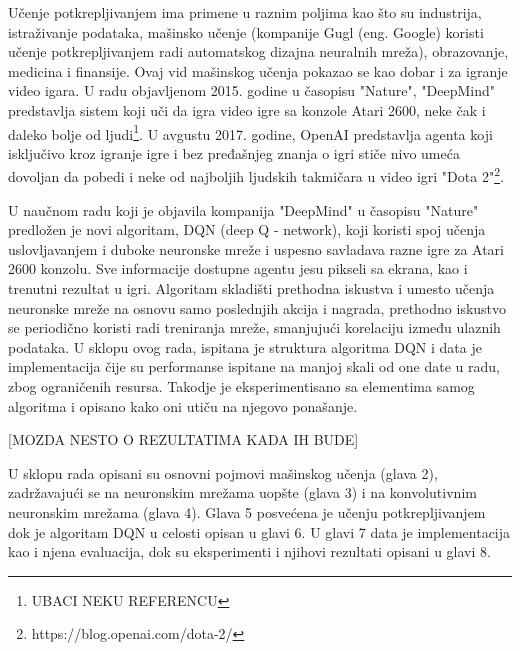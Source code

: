 Učenje potkrepljivanjem ima primene u raznim poljima kao što su industrija, istraživanje podataka, mašinsko učenje (kompanije Gugl (eng. Google) koristi učenje potkrepljivanjem radi automatskog dizajna neuralnih mreža), obrazovanje, medicina i finansije. Ovaj vid mašinskog učenja pokazao se kao dobar i za igranje video igara.  U radu objavljenom 2015. godine u časopisu "Nature", "DeepMind" predstavlja sistem koji uči da igra video igre sa konzole Atari 2600, neke čak i daleko bolje od ljudi\footnote{UBACI NEKU REFERENCU}. U avgustu 2017. godine, OpenAI predstavlja agenta koji isključivo kroz igranje igre i bez pređašnjeg znanja o igri stiče nivo umeća dovoljan da pobedi i neke od najboljih ljudskih takmičara u video igri "Dota 2"\footnote{https://blog.openai.com/dota-2/}. 

U naučnom radu koji je objavila kompanija "DeepMind" u časopisu "Nature" predložen je novi algoritam, DQN (deep Q - network), koji koristi spoj učenja uslovljavanjem i duboke neuronske mreže i uspesno savladava razne igre za Atari 2600 konzolu. Sve informacije dostupne agentu jesu pikseli sa ekrana, kao i trenutni rezultat u igri. Algoritam skladišti prethodna iskustva i umesto učenja neuronske mreže na osnovu samo poslednjih akcija i nagrada, prethodno iskustvo se periodično koristi radi treniranja mreže, smanjujući korelaciju između ulaznih podataka. 
U sklopu ovog rada, ispitana je struktura algoritma DQN i data je implementacija čije su performanse ispitane na manjoj skali od one date u radu, zbog ograničenih resursa. Takodje je eksperimentisano sa elementima samog algoritma i opisano kako oni utiču na njegovo ponašanje.


[MOZDA NESTO O REZULTATIMA KADA IH BUDE]


U sklopu rada opisani su osnovni pojmovi mašinskog učenja (glava 2), zadržavajući se na neuronskim mrežama uopšte (glava 3) i na konvolutivnim neuronskim mrežama (glava 4). Glava 5 posvećena je učenju potkrepljivanjem dok je algoritam DQN u celosti opisan u glavi 6. U glavi 7 data je implementacija kao i njena evaluacija, dok su eksperimenti i njihovi rezultati opisani u glavi 8. 